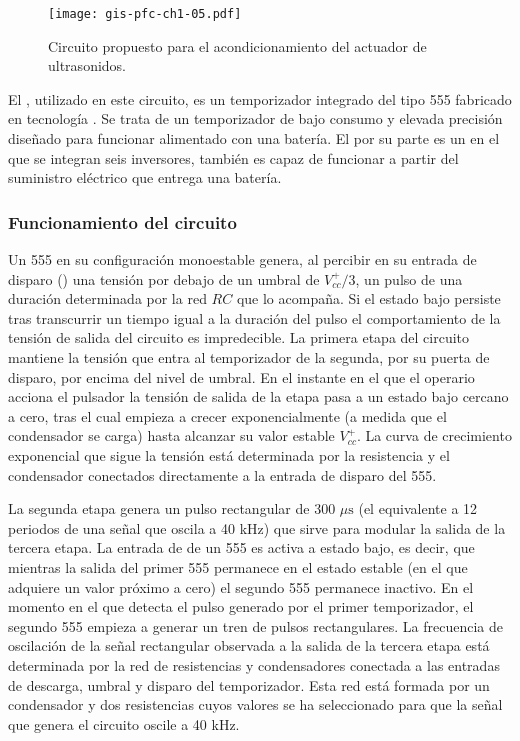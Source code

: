 \begin{sidewaysfigure}[p]
	\begin{center}
		\texttt{[image: gis-pfc-ch1-05.pdf]}
	\end{center}
	\caption[Circuito de acondicionamiento del actuador]{Circuito
	propuesto para el acondicionamiento del actuador de ultrasonidos.}
	\label{fig:actuator-conditioner}
\end{sidewaysfigure}

El , utilizado en este circuito, es un temporizador integrado
del tipo 555 fabricado en tecnología . Se trata de un
temporizador de bajo consumo y elevada precisión diseñado para funcionar
alimentado con una batería. El  por su parte es un 
en el que se integran seis inversores, también es capaz de funcionar a
partir del suministro eléctrico que entrega una batería.


\subsubsection{Funcionamiento del circuito}

Un 555 en su configuración monoestable genera, al percibir en su entrada de
disparo () una tensión por debajo de un umbral de $V^+_{cc}/3$,
un pulso de una duración determinada por la red $RC$ que lo acompaña. Si el
estado bajo persiste tras transcurrir un tiempo igual a la duración del
pulso el comportamiento de la tensión de salida del circuito es
impredecible. La primera etapa del circuito mantiene la tensión que entra
al temporizador de la segunda, por su puerta de disparo, por encima del
nivel de umbral. En el instante en el que el operario acciona el pulsador
la tensión de salida de la etapa pasa a un estado bajo cercano a cero, tras
el cual empieza a crecer exponencialmente (a medida que el condensador se
carga) hasta alcanzar su valor estable $V^+_{cc}$. La curva de crecimiento
exponencial que sigue la tensión está determinada por la resistencia y el
condensador conectados directamente a la entrada de disparo del 555.

La segunda etapa genera un pulso rectangular de 300 $\mu\text{s}$ (el
equivalente a 12 periodos de una señal que oscila a 40 kHz) que sirve para
modular la salida de la tercera etapa. La entrada de  de un 555
es activa a estado bajo, es decir, que mientras la salida del primer 555
permanece en el estado estable (en el que adquiere un valor próximo a cero)
el segundo 555 permanece inactivo. En el momento en el que detecta el pulso
generado por el primer temporizador, el segundo 555 empieza a generar un
tren de pulsos rectangulares. La frecuencia de oscilación de la señal
rectangular observada a la salida de la tercera etapa está determinada por
la red de resistencias y condensadores conectada a las entradas de
descarga, umbral y disparo del temporizador. Esta red está formada por un
condensador y dos resistencias cuyos valores se ha seleccionado para que
la señal que genera el circuito oscile a 40 kHz.

